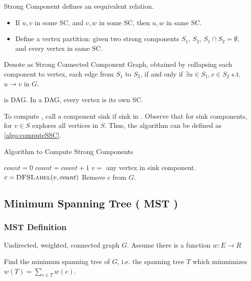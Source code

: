 Strong Component defines an eequivalent relation.
\begin{itemize}
    \item If $u,v$ in some SC, and $v,w$ in some SC, then
        $u,w$ in same SC.
    \item Define a vertex partition: given two strong components
        $S_1$, $S_2$, $S_1 \cap S_2 = \emptyset$,
        and every vertex in same SC.
\end{itemize}

Denote  as Strong Connected Component Graph,
obtained by collapsing each component to vertex, each edge
from $S_1$ to $S_2$, if and only if $\exists u \in S_1, v \in S_2$
s.t. $u \rightarrow v$ in $G$.

 is DAG.
In a DAG, every vertex is its own SC.

To compute , call a component sink if sink in
.
Observe that for sink components,  for $v \in S$
explores all vertices in $S$.
Thus, the algorithm can be defined as \cref{algo:computeSSC}.

\begin{algorithm}[H]
    \caption{Algorithm to Compute Strong Components}\label{algo:computeSSC}
    \begin{algorithmic}[1]
            \State $count = 0$
                \State $count = count + 1$
                \State $v = $ any vertex in sink component.
                \State $c = \textsc{DFSLabel} (v,count)$
                \State Remove $c$ from $G$.
            \EndWhile
        \EndProcedure
    \end{algorithmic}
\end{algorithm}

\subsection{Minimum Spanning Tree ( MST )}

\subsubsection{MST Definition}
\AlgoInput Undirected, weighted, connected graph $G$.
Assume there is a function $w:E \rightarrow R$

\AlgoOutput Find the minimum spanning tree of $G$,
i.e. the spanning tree $T$ which minmimizes
$\displaystyle w(T) = \sum_{e \in T} w(e)$.

